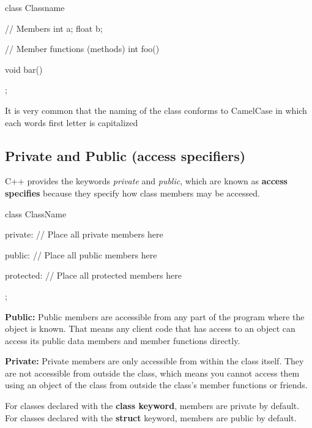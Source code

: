\documentclass{report}
\begin{document}
    \begin{cppcode}
class Classname {

    // Members
    int a;
    float b;

    // Member functions (methods)
    int foo() {

    }

    void bar() {

    }

};
    \end{cppcode}
    
    \bigbreak \noindent 
    It is very common that the naming of the class conforms to CamelCase in which each words first letter is capitalized

    \bigbreak \noindent 
    \subsection{Private and Public (access specifiers)}
    \bigbreak \noindent 
    C++ provides the keywords \textit{private} and \textit{public}, which are known as \textbf{access specifies} because they specify how class members may be accessed. 
    \bigbreak \noindent 
    
    \begin{cppcode}
class ClassName {
    private:
        // Place all private members here

    public: 
        // Place all public members here

    protected:
        // Place all protected members here
};
    \end{cppcode}
    
    \bigbreak \noindent 
    \textbf{Public:}
    \bigbreak \noindent 
    Public members are accessible from any part of the program where the object is known. That means any client code that has access to an object can access its public data members and member functions directly.

    \bigbreak \noindent 
    \textbf{Private:}
    \bigbreak \noindent 
    Private members are only accessible from within the class itself. They are not accessible from outside the class, which means you cannot access them using an object of the class from outside the class's member functions or friends. 
    \bigbreak \noindent 
    \begin{notebox}
        For classes declared with the \textbf{class keyword}, members are private by default. For classes declared with the \textbf{struct} keyword, members are public by default.
    \end{notebox}
    
\end{document}
